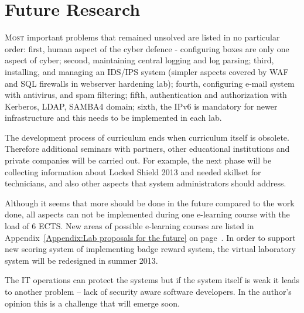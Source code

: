 \chapter{Future Research}
\label{Future Research}

\lettrine[lraise=0.1, nindent=0em, slope=-.5em]{\color{Violet}M}{ost} important problems that remained unsolved are listed in no particular order: first, human aspect of the cyber defence - configuring boxes are only one aspect of cyber; second, maintaining central logging and log parsing; third, installing, and managing an \gls{IDS}/\gls{IPS} system (simpler aspects covered by \gls{WAF} and \gls{SQL} firewalls in webserver hardening lab); fourth, configuring e-mail system with antivirus, and spam filtering; fifth, authentication and authorization with Kerberos, LDAP, SAMBA4 domain; sixth, the IPv6 is mandatory for newer infrastructure and this needs to be implemented in each lab.


The development process of curriculum ends when curriculum itself is obsolete. Therefore additional seminars with partners, other educational institutions and private companies will be carried out. For example, the next phase will be collecting information about Locked Shield 2013 and needed skillset for technicians, and also other aspects that system administrators should address.

Although it seems that more should be done in the future compared to the work done, all aspects can not be implemented during one e-learning course with the load of 6 \gls{ECTS}. New areas of possible e-learning courses are listed in Appendix~\ref{Appendix:Lab proposals for the future} on page~\pageref{Appendix:Lab proposals for the future}. In order to support new scoring system of implementing badge reward system, the virtual laboratory system will be redesigned in summer 2013.


The IT operations can protect the systems but if the system itself is weak it leads to another problem -- lack of security aware software developers. In the author’s opinion this is a challenge that will emerge soon.
